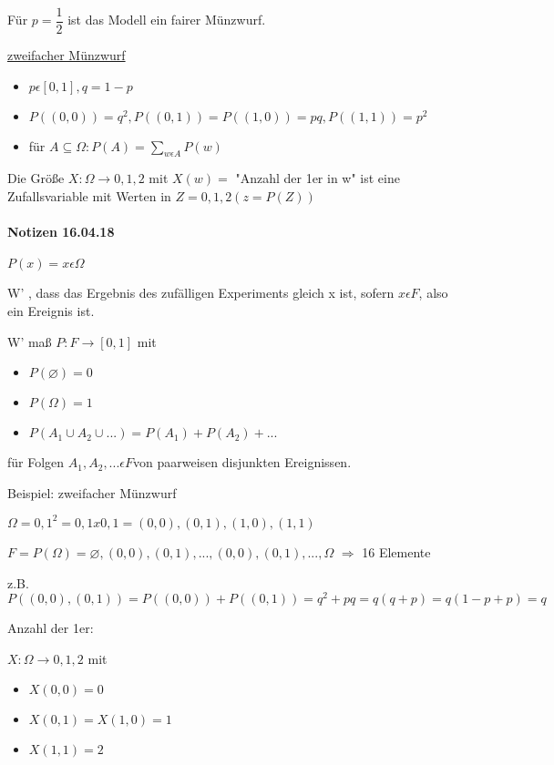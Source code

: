 \documentclass[paper=a4, fontsize=11pt]{scrartcl}
\numberwithin{equation}{section}
\numberwithin{figure}{section}
\numberwithin{table}{section}
\begin{document}
Für $p= \dfrac{1}{2}$ ist das Modell ein fairer Münzwurf.

\underline{zweifacher Münzwurf}

\begin{itemize}
\item $p \epsilon [0,1], q = 1-p$
\item $P({(0,0)}) = q^{2}, P({(0,1)})=P({(1,0)})= pq, P({(1,1)})= p^{2}$
\item für $A \subseteq \Omega : P(A) = \sum _{w \epsilon A} P({w})$
\end{itemize}

Die Größe $X: \Omega \rightarrow {0,1,2}$ mit $X(w)=$ "Anzahl der 1er in w" ist eine Zufallsvariable mit Werten in $Z = {0,1,2} (z = P (Z))$


\paragraph{Notizen 16.04.18}

$P ({x}) = x \epsilon \Omega $

W' , dass das Ergebnis des zufälligen Experiments gleich x ist, sofern ${x} \epsilon F$, also ein Ereignis ist.

W' maß $P: F \rightarrow [0,1]$ mit 
\begin{itemize}
\item $P( \varnothing ) = 0$
\item $P( \Omega ) = 1$
\item $P(A_{1} \cup A_{2} \cup ... ) = P(A_{1})+P(A_{2})+... $
\end{itemize}
für Folgen $A_{1}, A_{2},... \epsilon F$von paarweisen disjunkten Ereignissen.

Beispiel: zweifacher Münzwurf

$\Omega = {0,1} ^{2} = {0,1} x {0,1} = {(0,0),(0,1),(1,0),(1,1)}$

$F = P( \Omega ) = {\varnothing , {(0,0)}, {(0,1)}, ... , {(0,0),(0,1)}, ... , \Omega }$ $\Rightarrow$ 16 Elemente

z.B. $P({(0,0),(0,1)}) = P({(0,0)})+P({(0,1)}) = q^{2}+ pq = q (q+p) = q (1-p+p) = q $

Anzahl der 1er:

$X: \Omega \rightarrow {0,1,2}$ mit
\begin{itemize}
\item $X(0,0)=0$
\item $X(0,1)= X(1,0)=1$
\item $X(1,1)= 2$
\end{itemize}
\end{document}
